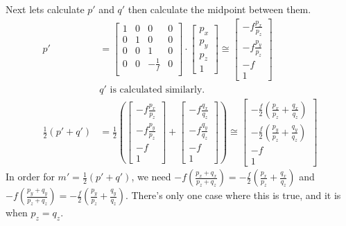 \documentclass{article} %
\begin{document}
Next lets calculate $p'$ and $q'$ then calculate the midpoint between them.
\begin{align*}
p' &=
\left[
\begin{matrix}
1 & 0 & 0 & 0\\
0 & 1 & 0 & 0\\
0 & 0 & 1 & 0\\
0 & 0 & -\frac{1}{f} & 0\\
\end{matrix}
\right]
\cdot
\left[\begin{matrix}
p_x\\
p_y\\
p_z\\
1
\end{matrix}
\right]
\cong
\left[\begin{matrix}
-f\frac{p_x}{p_z}\\
-f\frac{p_y}{p_z}\\
-f\\
1
\end{matrix}
\right]\\
&\text{$q'$ is calculated similarly.}\\
\frac{1}{2}\left(p'+q'\right) &= 
\frac{1}{2}
\left(
\left[\begin{matrix}
-f\frac{p_x}{p_z}\\
-f\frac{p_y}{p_z}\\
-f\\
1
\end{matrix}
\right]
+
\left[\begin{matrix}
-f\frac{q_x}{q_z}\\
-f\frac{q_y}{q_z}\\
-f\\
1
\end{matrix}
\right]
\right)
\cong
\left[\begin{matrix}
-\frac{f}{2}\left(\frac{p_x}{p_z} + \frac{q_x}{q_z}\right)\\
-\frac{f}{2}\left(\frac{p_y}{p_z} + \frac{q_y}{q_z}\right)\\
-f\\
1
\end{matrix}
\right]
\end{align*}
In order for $m' = \frac{1}{2}(p'+q')$, we need $-f\left(\frac{p_x + q_x}{p_z + q_z}\right) = -\frac{f}{2}\left(\frac{p_x}{p_z} + \frac{q_x}{q_z}\right)$ and $-f\left(\frac{p_y + q_y}{p_z + q_z}\right) = -\frac{f}{2}\left(\frac{p_y}{p_z} + \frac{q_y}{q_z}\right)$. There's only one case where this is true, and it is when $p_z = q_z$.
\\
\end{document}
